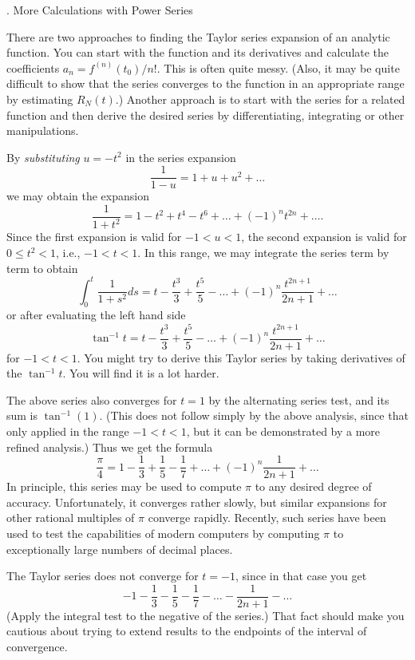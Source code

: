 \smallskip
{}
\bigskip

\bigskip

\head \sn.  More Calculations with Power Series \endhead

There are two approaches to finding the Taylor series expansion
of an analytic function.  You can start with the function and
its derivatives and calculate the coefficients $a_n = f^{(n)}(t_0)/n!$.
This is often quite messy.  (Also, it may be quite difficult
to show
that the series converges to the function in an appropriate
range  by  
estimating $R_N(t)$.)  Another approach is to start with the
series for a related function and then derive the desired series 
by differentiating, integrating or other manipulations.

\nextex
{}  By {\it substituting\/}  $u = -t^2$ in
the series expansion
$$
\frac 1{1 - u}  = 1 + u + u^2 + \dots
$$ we may obtain
the expansion
$$
\frac 1{1 + t^2} = 1  - t^2 + t^4 - t^6 + \dots + (-1)^nt^{2n} + \dots.
$$
Since the first expansion is valid for $-1 < u < 1$, the second
expansion is valid for $0\le t^2 < 1$, i.e., $-1< t < 1$.
In this range,
we may integrate the series term by term to obtain
$$
\int_0^t\frac 1{1 + s^2}ds = t -\frac{t^3}3 + \frac{t^5}5 -
\dots + (-1)^n\frac {t^{2n+1}}{2n+1} + \dots
$$
or after evaluating the left hand side
$$
\tan^{-1}t = t -\frac{t^3}3 + \frac{t^5}5 -\dots + (-1)^n\frac {t^{2n+1}}{2n+1} + \dots
$$
for $-1 < t < 1$.  You might try to derive this Taylor series by taking
derivatives of the $\tan^{-1} t$.  You will find it is a lot harder.

The above series also converges  for $t = 1$ by the alternating series
test, and its sum is $\tan^{-1} (1)$.  (This does not follow simply
by the above analysis, since that only applied in the range $-1 < t <1$,
but it can be demonstrated by a more refined analysis.)  Thus
we get the formula
$$
\frac{\pi}4 =
1 -\frac 13 + \frac 15 - \frac 17 + \dots +  (-1)^n\frac 1{2n+1} + \dots
$$
In principle, this series may be used to compute $\pi$ to any
desired degree of accuracy.   Unfortunately, it converges rather
slowly, but similar expansions for other rational multiples of
$\pi$ converge rapidly.  Recently, such series have been used
to test the capabilities of modern computers by computing $\pi$
to exceptionally large numbers of decimal places.

The Taylor series does not converge for
 $t = -1$,  since in that case you get
$$
-1 -\frac 13 - \frac 15 - \frac 17 - \dots - \frac 1{2n+1} - \dots
$$
(Apply the integral test to the negative of the series.)  That fact
should make you cautious about trying to extend results to the
endpoints of the interval of convergence.
\endexample

